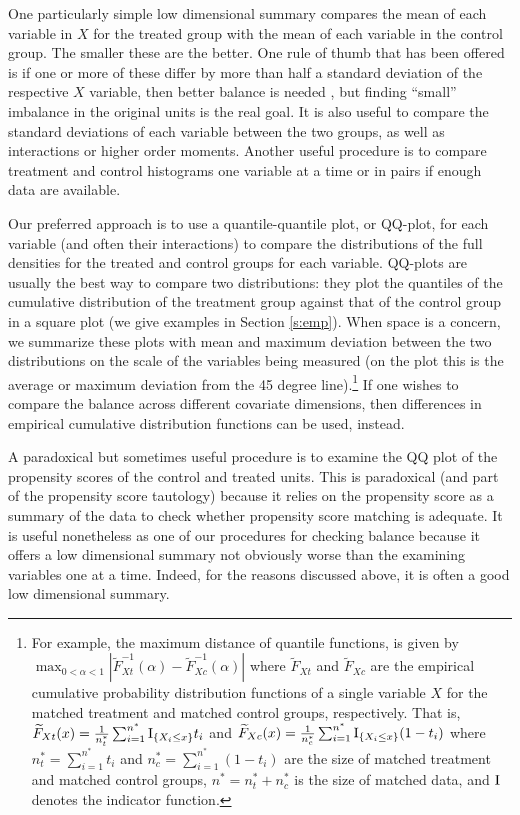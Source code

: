 \documentclass[11pt,titlepage]{article}
\begin{document}
One particularly simple low dimensional summary compares the mean of
each variable in $X$ for the treated group with the mean of each
variable in the control group.  The smaller these are the better.  One
rule of thumb that has been offered is if one or more of these differ
by more than half a standard deviation of the respective $X$ variable,
then better balance is needed \citep{Cochran68}, but finding ``small''
imbalance in the original units is the real goal.  It is also useful
to compare the standard deviations of each variable between the two
groups, as well as interactions or higher order moments.  Another
useful procedure is to compare treatment and control histograms one
variable at a time or in pairs if enough data are
available.

Our preferred approach is to use a quantile-quantile plot, or QQ-plot,
for each variable (and often their interactions) to compare the
distributions of the full densities for the treated and control groups
for each variable.  QQ-plots are usually the best way to compare two
distributions: they plot the quantiles of the cumulative distribution
of the treatment group against that of the control group in a square
plot (we give examples in Section \ref{s:emp}).  When space is a
concern, we summarize these plots with mean and maximum deviation
between the two distributions on the scale of the variables being
measured (on the plot this is the average or maximum deviation from
the 45 degree line).\footnote{For example, the maximum distance of
  quantile functions, is given by $\max_{0 < \alpha < 1}
  |\widetilde{F}_{Xt}^{-1}(\alpha)-\widetilde{F}^{-1}_{Xc}(\alpha)|$
  where $\widetilde{F}_{Xt}$ and $\widetilde{F}_{Xc}$ are the
  empirical cumulative probability distribution functions of a single
  variable $X$ for the matched treatment and matched control groups,
  respectively. That is, $\widetilde{F}_{Xt}(x)=\frac{1}{n^*_t}
  \sum_{i=1}^{n^*} {\rm I}_{\{X_i \le x\}} t_i$ and
  $\widetilde{F}_{Xc}(x)=\frac{1}{n^*_c} \sum_{i=1}^{n^*} {\rm
    I}_{\{X_i \le x\}} (1-t_i)$ where $n^*_t=\sum_{i=1}^{n^*} t_i$ and
  $n^*_c=\sum_{i=1}^{n^*} (1-t_i)$ are the size of matched treatment
  and matched control groups, $n^*=n^*_t + n^*_c$ is the size of
  matched data, and ${\rm I}$ denotes the indicator function.} If one
wishes to compare the balance across different covariate dimensions,
then differences in empirical cumulative distribution functions can be
used, instead.

A paradoxical but sometimes useful procedure is to examine the QQ plot
of the propensity scores of the control and treated units.  This is
paradoxical (and part of the propensity score tautology) because it
relies on the propensity score as a summary of the data to check
whether propensity score matching is adequate.  It is useful
nonetheless as one of our procedures for checking balance because it
offers a low dimensional summary not obviously worse than the
examining variables one at a time.  Indeed, for the reasons discussed
above, it is often a good low dimensional summary.
\end{document}
